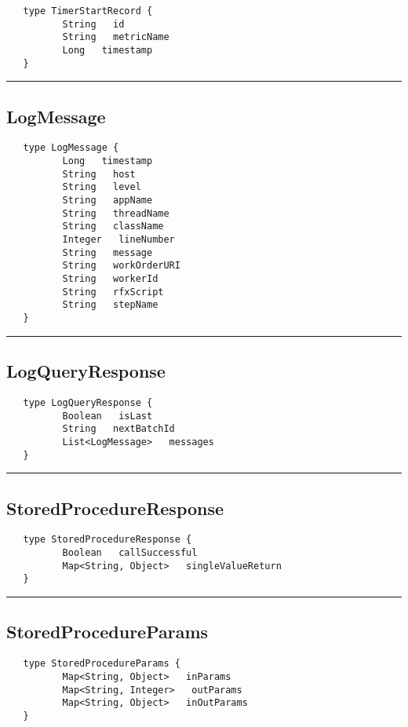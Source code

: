 \begin{verbatim}
   type TimerStartRecord {
          String   id
          String   metricName
          Long   timestamp
   }
\end{verbatim}

\rule{15cm}{2pt}
\subsection{LogMessage}
\label{type:LogMessage}

\begin{verbatim}
   type LogMessage {
          Long   timestamp
          String   host
          String   level
          String   appName
          String   threadName
          String   className
          Integer   lineNumber
          String   message
          String   workOrderURI
          String   workerId
          String   rfxScript
          String   stepName
   }
\end{verbatim}

\rule{15cm}{2pt}
\subsection{LogQueryResponse}
\label{type:LogQueryResponse}

\begin{verbatim}
   type LogQueryResponse {
          Boolean   isLast
          String   nextBatchId
          List<LogMessage>   messages
   }
\end{verbatim}

\rule{15cm}{2pt}
\subsection{StoredProcedureResponse}
\label{type:StoredProcedureResponse}

\begin{verbatim}
   type StoredProcedureResponse {
          Boolean   callSuccessful
          Map<String, Object>   singleValueReturn
   }
\end{verbatim}

\rule{15cm}{2pt}
\subsection{StoredProcedureParams}
\label{type:StoredProcedureParams}

\begin{verbatim}
   type StoredProcedureParams {
          Map<String, Object>   inParams
          Map<String, Integer>   outParams
          Map<String, Object>   inOutParams
   }
\end{verbatim}

